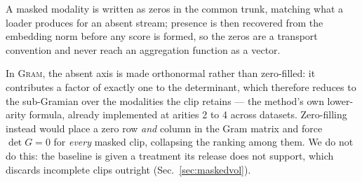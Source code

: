 A masked modality is written as zeros in the common trunk, matching what
a loader produces for an absent stream; presence is then recovered from
the embedding norm before any score is formed, so the zeros are a
transport convention and never reach an aggregation function as a vector.

%

In \textsc{Gram}, the absent axis is made orthonormal rather than
zero-filled: it contributes a factor of exactly one to the determinant,
which therefore reduces to the sub-Gramian over the modalities the clip
retains --- the method's own lower-arity formula, already implemented at
arities 2 to 4 across datasets. Zero-filling instead would place a zero
row \emph{and} column in the Gram matrix and force $\det G = 0$ for
\emph{every} masked clip, collapsing the ranking among them. We do not do
this: the baseline is given a treatment its release does not support,
which discards incomplete clips outright (Sec.~\ref{sec:maskedvol}).


%
%

